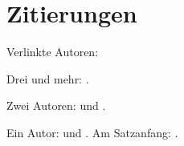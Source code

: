 \documentclass[ngerman]{scrbook}
\begin{document}
\chapter{Zitierungen}
Verlinkte Autoren:

Drei und mehr: \citeauthor{ABC01} \cite{ABC01}.

Zwei Autoren: \citeauthor{AB00} \cite{AB00} und \citeauthor{vdAW2013} \cite{vdAW2013}.

Ein Autor: \citeauthor{Ez10} \cite{Ez10} und \citeauthor{Go10} \cite{Go10}.
Am Satzanfang: .

\nocite{*}
\printbibliography
\end{document}
